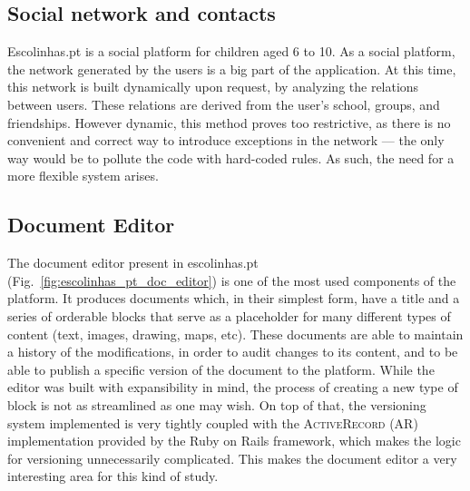 \subsection{Social network and contacts}\label{sec:case-study_areas_social_network}
Escolinhas.pt is a social platform for children aged 6 to 10. As a social platform, the network generated by the users is a big part of the application. At this time, this network is built dynamically upon request, by analyzing the relations between users. These relations are derived from the user's school, groups, and friendships. However dynamic, this method proves too restrictive, as there is no convenient and correct way to introduce exceptions in the network --- the only way would be to pollute the code with hard-coded rules. As such, the need for a more flexible system arises.

\subsection{Document Editor}\label{sec:case-study_areas_document_editor}
The document editor present in escolinhas.pt (Fig.~\ref{fig:escolinhas_pt_doc_editor}) is one of the most used components of the platform. It produces documents which, in their simplest form, have a title and a series of orderable blocks that serve as a placeholder for many different types of content (text, images, drawing, maps, etc). These documents are able to maintain a history of the modifications, in order to audit changes to its content, and to be able to publish a specific version of the document to the platform. While the editor was built with expansibility in mind, the process of creating a new type of block is not as streamlined as one may wish. On top of that, the versioning system implemented is very tightly coupled with the \textsc{ActiveRecord} (AR) implementation provided by the Ruby on Rails framework, which makes the logic for versioning unnecessarily complicated. This makes the document editor a very interesting area for this kind of study.

